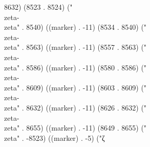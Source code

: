 {{8632) (8523 . 8524) ("\\zeta-\\zeta" . 8540) ((marker) . -11) (8534 . 8540) ("\\zeta-\\zeta" . 8563) ((marker) . -11) (8557 . 8563) ("\\zeta-\\zeta" . 8586) ((marker) . -11) (8580 . 8586) ("\\zeta-\\zeta" . 8609) ((marker) . -11) (8603 . 8609) ("\\zeta-\\zeta" . 8632) ((marker) . -11) (8626 . 8632) ("\\zeta-\\zeta" . 8655) ((marker) . -11) (8649 . 8655) ("\\zeta" . -8523) ((marker) . -5) ("ζ
}}
